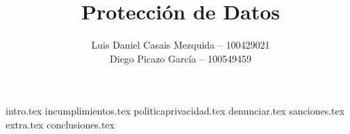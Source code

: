 \documentclass[es]{uc3mreport}
\author{
    Luis Daniel Casais Mezquida -- 100429021\\
    Diego Picazo García -- 100549459
}
\title{Protección de Datos}
\begin{document}
    \makecover


    \begin{report}

        {intro.tex}
        {incumplimientos.tex}
        {politicaprivacidad.tex}
        {denunciar.tex}
        {sanciones.tex}
        {extra.tex}
        {conclusiones.tex}

    \end{report}

    \label{bibliography}
    \printbibliography[title={Referencias}]
\end{document}
